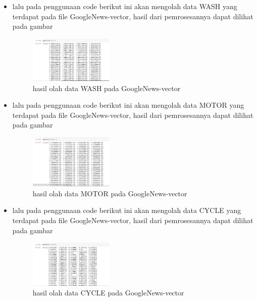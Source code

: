 \begin{enumerate}
\begin{itemize}
        \item  lalu pada penggunaan code berikut ini akan mengolah data WASH yang terdapat pada file GoogleNews-vector, hasil dari pemrosesannya dapat dilihat pada gambar
        \begin{figure}[H]
            \includegraphics[width=4cm]{figures/1174096/tugas5/praktek1-10.PNG}
            \centering
            \caption{hasil olah data WASH pada GoogleNews-vector}
        \end{figure}
        
        \item  lalu pada penggunaan code berikut ini akan mengolah data MOTOR yang terdapat pada file GoogleNews-vector, hasil dari pemrosesannya dapat dilihat pada gambar 
        \begin{figure}[H]
            \includegraphics[width=4cm]{figures/1174096/tugas5/praktek1-11.PNG}
            \centering
            \caption{hasil olah data MOTOR pada GoogleNews-vector}
        \end{figure}
        
        \item  lalu pada penggunaan code berikut ini akan mengolah data CYCLE yang terdapat pada file GoogleNews-vector, hasil dari pemrosesannya dapat dilihat pada gambar
        \begin{figure}[H]
            \includegraphics[width=4cm]{figures/1174096/tugas5/praktek1-12.PNG}
            \centering
            \caption{hasil olah data CYCLE pada GoogleNews-vector}
        \end{figure}
        

\end{itemize}
\end{enumerate}
